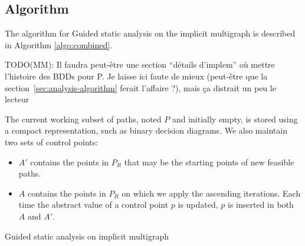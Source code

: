 \documentclass[preprint]{sigplanconf}
\newcommand{\MM}[1]{{\color{blue} TODO(MM): #1}}
\begin{document}
\subsection{Algorithm}


The algorithm for Guided static analysis on the implicit multigraph is described
in Algorithm \ref{algo:combined}.

\MM{Il faudra peut-être une section ``détails d'implem'' où mettre
  l'histoire des BDDs pour P. Je laisse ici faute de mieux (peut-être
  que la section~\ref{sec:analysis-algorithm} ferait l'affaire ?),
  mais ça distrait un peu le lecteur}

The current working subset of paths, noted $P$ and initially empty, is
stored using a compact representation, such as binary decision
diagrams. We also maintain two sets of control points:
\begin{itemize}
	\item $A'$ contains the points in $P_R$ that may be the starting points of new
		feasible paths.
	\item $A$ contains the points in $P_R$ on which we apply the ascending iterations.
	Each time the abstract value of a control point $p$ is updated, $p$ is
	inserted in both $A$ and $A'$.
\end{itemize}

\begin{algorithm}
	\caption{Guided static analysis on implicit multigraph}
	\label{algo:combined}
	\begin{algorithmic}[1] 
	
	\end{algorithmic}
\end{algorithm}
\end{document}
